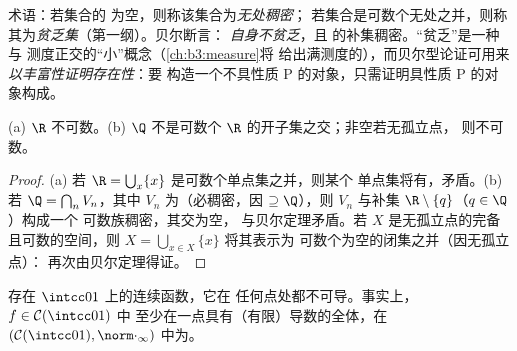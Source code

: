 \begin{remark}\label{rem:b3:complete:meagre}
术语：若集合的
为空，则称该集合为\emph{无处稠密}；
若集合是可数个无处之并，则称其为\emph{贫乏集}（第一纲）。贝尔断言：
\emph{自身不贫乏}，且
的补集稠密。“贫乏”是一种与
测度正交的“小”概念（\cref{ch:b3:measure}将
给出满测度的），而贝尔型论证可用来
\emph{以丰富性证明存在性}：要
构造一个不具性质 P 的对象，只需证明具性质 P 的对象构成。
\end{remark}

\begin{corollary}\label{cor:b3:complete:bairecors}
(a) $\R$ 不可数。(b) $\Q$ 不是可数个
$\R$ 的开子集之交；非空若无孤立点，
则不可数。
\end{corollary}

\begin{proof}
(a) 若 $\R = \bigcup_{x}\{x\}$ 是可数个单点集之并，则某个
单点集将有，矛盾。(b) 若 $\Q = \bigcap_n V_n$，其中 $V_n$
为（必稠密，因 $\supseteq \Q$），则
$V_n$ 与补集 $\R\setminus\{q\}$（$q \in \Q$）构成一个
可数族稠密，其交为空，
与贝尔定理矛盾。若 $X$ 是无孤立点的完备
且可数的空间，则 $X = \bigcup_{x \in X}\{x\}$ 将其表示为
可数个为空的闭集之并（因无孤立点）：
再次由贝尔定理得证。
\end{proof}

\begin{theorem}
\label{thm:b3:complete:nowherediff}
存在 $\intcc01$ 上的连续函数，它在
任何点处都不可导。事实上，$f \in \mathcal C(\intcc01)$ 中
至少在一点具有（有限）导数的全体，在
$(\mathcal C(\intcc01), \norm\cdot_\infty)$ 中为。
\end{theorem}

